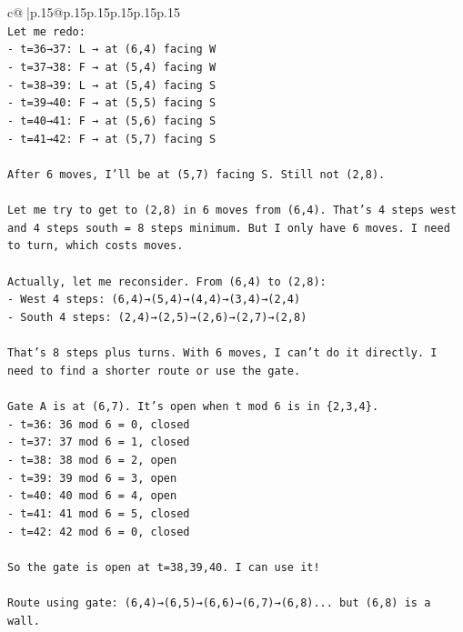 \documentclass{article}
\begin{document}
{\begin{supertabular}{c@{$\;$}|p{.15\linewidth}@{}p{.15\linewidth}p{.15\linewidth}p{.15\linewidth}p{.15\linewidth}p{.15\linewidth}}
{{{\\ 
\texttt{Let me redo:} \\
\texttt{{-} t=36→37: L → at (6,4) facing W} \\
\texttt{{-} t=37→38: F → at (5,4) facing W} \\
\texttt{{-} t=38→39: L → at (5,4) facing S} \\
\texttt{{-} t=39→40: F → at (5,5) facing S} \\
\texttt{{-} t=40→41: F → at (5,6) facing S} \\
\texttt{{-} t=41→42: F → at (5,7) facing S} \\
\\ 
\texttt{After 6 moves, I'll be at (5,7) facing S. Still not (2,8).} \\
\\ 
\texttt{Let me try to get to (2,8) in 6 moves from (6,4). That's 4 steps west and 4 steps south = 8 steps minimum. But I only have 6 moves. I need to turn, which costs moves.} \\
\\ 
\texttt{Actually, let me reconsider. From (6,4) to (2,8):} \\
\texttt{{-} West 4 steps: (6,4)→(5,4)→(4,4)→(3,4)→(2,4)} \\
\texttt{{-} South 4 steps: (2,4)→(2,5)→(2,6)→(2,7)→(2,8)} \\
\\ 
\texttt{That's 8 steps plus turns. With 6 moves, I can't do it directly. I need to find a shorter route or use the gate.} \\
\\ 
\texttt{Gate A is at (6,7). It's open when t mod 6 is in \{2,3,4\}.} \\
\texttt{{-} t=36: 36 mod 6 = 0, closed} \\
\texttt{{-} t=37: 37 mod 6 = 1, closed} \\
\texttt{{-} t=38: 38 mod 6 = 2, open} \\
\texttt{{-} t=39: 39 mod 6 = 3, open} \\
\texttt{{-} t=40: 40 mod 6 = 4, open} \\
\texttt{{-} t=41: 41 mod 6 = 5, closed} \\
\texttt{{-} t=42: 42 mod 6 = 0, closed} \\
\\ 
\texttt{So the gate is open at t=38,39,40. I can use it!} \\
\\ 
\texttt{Route using gate: (6,4)→(6,5)→(6,6)→(6,7)→(6,8)... but (6,8) is a wall.} \\
}}}
\end{supertabular}}
\end{document}
